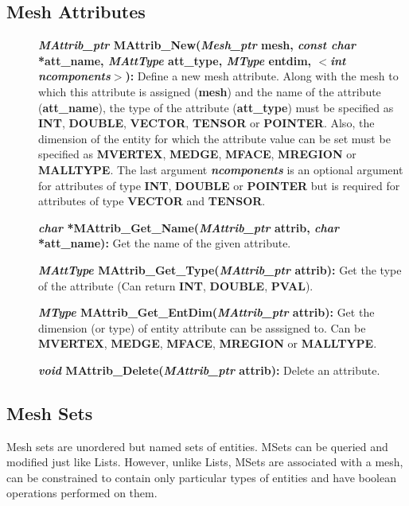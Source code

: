 \documentclass[12pt]{article}
\begin{document}
\newpage
\subsection{Mesh Attributes}

\begin{description}
  
\item[]{\bf {\em MAttrib\_ptr} MAttrib\_New({\em Mesh\_ptr} mesh, {\em
      const char} *att\_name, {\em MAttType} att\_type, {\em MType}
    entdim, $<${\em int ncomponents}$>$):} Define a new mesh
  attribute. Along with the mesh to which this attribute is assigned
  ({\bf mesh}) and the name of the attribute ({\bf att\_name}), the
  type of the attribute ({\bf att\_type}) must be specified as {\bf
    INT}, {\bf DOUBLE}, {\bf VECTOR}, {\bf TENSOR} or {\bf
    POINTER}. Also, the dimension of the entity for which the
  attribute value can be set must be specified as {\bf MVERTEX}, {\bf
    MEDGE}, {\bf MFACE}, {\bf MREGION} or {\bf MALLTYPE}. The last
  argument {\em {\bf ncomponents}} is an optional argument for attributes of
  type {\bf INT}, {\bf DOUBLE} or {\bf POINTER} but is required for
  attributes of type {\bf VECTOR} and {\bf TENSOR}.

\item[]{\bf {\em char} *MAttrib\_Get\_Name({\em MAttrib\_ptr}
    attrib, {\em char} *att\_name):} Get the name of the given attribute.
  
\item[]{\bf {\em MAttType}
    MAttrib\_Get\_Type({\em MAttrib\_ptr} attrib):} Get the type of
  the attribute (Can return {\bf INT}, {\bf DOUBLE},
  {\bf PVAL}).
  
\item[]{\bf {\em MType}
    MAttrib\_Get\_EntDim({\em MAttrib\_ptr} attrib):} Get the
  dimension (or type) of entity attribute can be asssigned to. Can be
  {\bf MVERTEX}, {\bf MEDGE}, {\bf MFACE}, {\bf MREGION}
  or {\bf MALLTYPE}.
  
\item[]{\bf {\em void} MAttrib\_Delete({\em MAttrib\_ptr}
    attrib):} Delete an attribute.

\end{description}

\newpage
\subsection{Mesh Sets}

Mesh sets are unordered but named sets of entities. MSets can be
queried and modified just like Lists. However, unlike Lists, MSets are
associated with a mesh, can be constrained to contain only particular
types of entities and have boolean operations performed on them.
\end{document}

